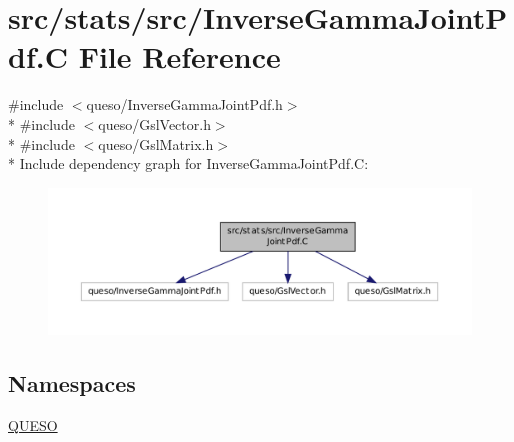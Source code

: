 \hypertarget{_inverse_gamma_joint_pdf_8_c}{\section{src/stats/src/\-Inverse\-Gamma\-Joint\-Pdf.C File Reference}
\label{_inverse_gamma_joint_pdf_8_c}
}
{\ttfamily \#include $<$queso/\-Inverse\-Gamma\-Joint\-Pdf.\-h$>$}\\*
{\ttfamily \#include $<$queso/\-Gsl\-Vector.\-h$>$}\\*
{\ttfamily \#include $<$queso/\-Gsl\-Matrix.\-h$>$}\\*
Include dependency graph for Inverse\-Gamma\-Joint\-Pdf.\-C\-:
\nopagebreak
\begin{figure}[H]
\begin{center}
\leavevmode
\includegraphics[width=350pt]{_inverse_gamma_joint_pdf_8_c__incl}
\end{center}
\end{figure}
\subsection*{Namespaces}
\begin{DoxyCompactItemize}
\item 
\hyperlink{namespace_q_u_e_s_o}{Q\-U\-E\-S\-O}
\end{DoxyCompactItemize}
